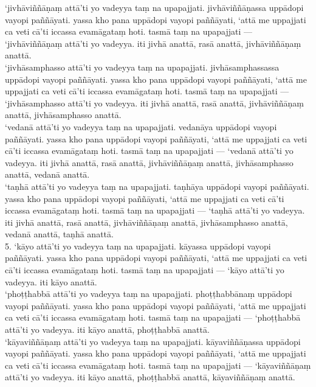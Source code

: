 \documentclass[10pt]{article}
\begin{document}
‘jivhāviññāṇaṃ attā’ti yo vadeyya taṃ na upapajjati. jivhāviññāṇassa uppādopi vayopi paññāyati. yassa kho pana uppādopi vayopi paññāyati, ‘attā me uppajjati ca veti cā’ti iccassa evamāgataṃ hoti. tasmā taṃ na upapajjati — ‘jivhāviññāṇaṃ attā’ti yo vadeyya. iti jivhā anattā, rasā anattā, jivhāviññāṇaṃ anattā.\\

‘jivhāsamphasso attā’ti yo vadeyya taṃ na upapajjati. jivhāsamphassassa uppādopi vayopi paññāyati. yassa kho pana uppādopi vayopi paññāyati, ‘attā me uppajjati ca veti cā’ti iccassa evamāgataṃ hoti. tasmā taṃ na upapajjati — ‘jivhāsamphasso attā’ti yo vadeyya. iti jivhā anattā, rasā anattā, jivhāviññāṇaṃ anattā, jivhāsamphasso anattā.\\

‘vedanā attā’ti yo vadeyya taṃ na upapajjati. vedanāya uppādopi vayopi paññāyati. yassa kho pana uppādopi vayopi paññāyati, ‘attā me uppajjati ca veti cā’ti iccassa evamāgataṃ hoti. tasmā taṃ na upapajjati — ‘vedanā attā’ti yo vadeyya. iti jivhā anattā, rasā anattā, jivhāviññāṇaṃ anattā, jivhāsamphasso anattā, vedanā anattā.\\

‘taṇhā attā’ti yo vadeyya taṃ na upapajjati. taṇhāya uppādopi vayopi paññāyati. yassa kho pana uppādopi vayopi paññāyati, ‘attā me uppajjati ca veti cā’ti iccassa evamāgataṃ hoti. tasmā taṃ na upapajjati — ‘taṇhā attā’ti yo vadeyya. iti jivhā anattā, rasā anattā, jivhāviññāṇaṃ anattā, jivhāsamphasso anattā, vedanā anattā, taṇhā anattā.\\

5. ‘kāyo attā’ti yo vadeyya taṃ na upapajjati. kāyassa uppādopi vayopi paññāyati. yassa kho pana uppādopi vayopi paññāyati, ‘attā me uppajjati ca veti cā’ti iccassa evamāgataṃ hoti. tasmā taṃ na upapajjati — ‘kāyo attā’ti yo vadeyya. iti kāyo anattā.\\

‘phoṭṭhabbā attā’ti yo vadeyya taṃ na upapajjati. phoṭṭhabbānaṃ uppādopi vayopi paññāyati. yassa kho pana uppādopi vayopi paññāyati, ‘attā me uppajjati ca veti cā’ti iccassa evamāgataṃ hoti. tasmā taṃ na upapajjati — ‘phoṭṭhabbā attā’ti yo vadeyya. iti kāyo anattā, phoṭṭhabbā anattā.\\

‘kāyaviññāṇaṃ attā’ti yo vadeyya taṃ na upapajjati. kāyaviññāṇassa uppādopi vayopi paññāyati. yassa kho pana uppādopi vayopi paññāyati, ‘attā me uppajjati ca veti cā’ti iccassa evamāgataṃ hoti. tasmā taṃ na upapajjati — ‘kāyaviññāṇaṃ attā’ti yo vadeyya. iti kāyo anattā, phoṭṭhabbā anattā, kāyaviññāṇaṃ anattā.\\
\end{document}
